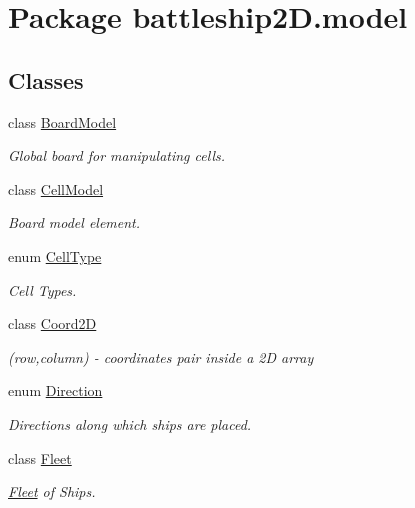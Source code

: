 \hypertarget{namespacebattleship2D_1_1model}{\section{Package battleship2\-D.\-model}
\label{namespacebattleship2D_1_1model}
}
\subsection*{Classes}
\begin{DoxyCompactItemize}
\item 
class \hyperlink{classbattleship2D_1_1model_1_1BoardModel}{Board\-Model}
\begin{DoxyCompactList}\small\item\em Global board for manipulating cells. \end{DoxyCompactList}\item 
class \hyperlink{classbattleship2D_1_1model_1_1CellModel}{Cell\-Model}
\begin{DoxyCompactList}\small\item\em Board model element. \end{DoxyCompactList}\item 
enum \hyperlink{enumbattleship2D_1_1model_1_1CellType}{Cell\-Type}
\begin{DoxyCompactList}\small\item\em Cell Types. \end{DoxyCompactList}\item 
class \hyperlink{classbattleship2D_1_1model_1_1Coord2D}{Coord2\-D}
\begin{DoxyCompactList}\small\item\em (row,column) -\/ coordinates pair inside a 2\-D array \end{DoxyCompactList}\item 
enum \hyperlink{enumbattleship2D_1_1model_1_1Direction}{Direction}
\begin{DoxyCompactList}\small\item\em Directions along which ships are placed. \end{DoxyCompactList}\item 
class \hyperlink{classbattleship2D_1_1model_1_1Fleet}{Fleet}
\begin{DoxyCompactList}\small\item\em \hyperlink{classbattleship2D_1_1model_1_1Fleet}{Fleet} of Ships. \end{DoxyCompactList}\item 

\end{DoxyCompactItemize}
